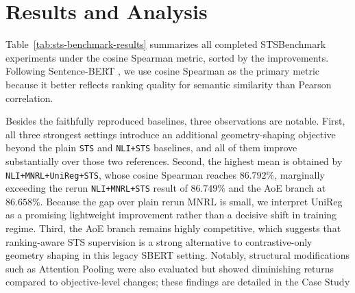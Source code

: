 \documentclass[letterpaper]{article} %
\begin{document}
\section{Results and Analysis}
Table~\ref{tab:sts-benchmark-results} summarizes all completed STSBenchmark experiments under the cosine
Spearman metric, sorted by the improvements. Following Sentence-BERT
\cite{reimers-gurevych-2019-sentence-bert}, we use cosine Spearman as the primary metric because it
better reflects ranking quality for semantic similarity than Pearson correlation.

\begin{table}[ht]
\centering
\caption{Main STSBenchmark results for different methods.}
\label{tab:sts-benchmark-results}
\end{table}

Besides the faithfully reproduced baselines, three observations are notable. 
First, all three strongest settings introduce an additional
geometry-shaping objective beyond the plain \texttt{STS} and \texttt{NLI+STS} baselines, and all of
them improve substantially over those two references. Second, the highest mean is obtained by
\texttt{NLI+MNRL+UniReg+STS}, whose cosine Spearman reaches $86.792\%$, marginally exceeding the rerun
\texttt{NLI+MNRL+STS} result of $86.749\%$ and the AoE branch at $86.658\%$. Because the gap over
plain rerun MNRL is small, we interpret UniReg as a promising lightweight improvement rather than a
decisive shift in training regime. Third, the AoE branch remains highly competitive, which suggests
that ranking-aware STS supervision is a strong alternative to contrastive-only geometry shaping in
this legacy SBERT setting. Notably, structural modifications such as Attention Pooling were also evaluated but showed diminishing returns compared to objective-level changes; these findings are detailed in the Case Study
\end{document}
